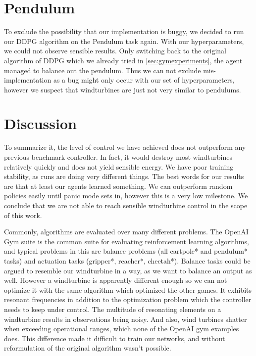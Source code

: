 \documentclass[hyperref,final,beleg]{cgvpub}
\begin{document}
\section{Pendulum}
To exclude the possibility that our implementation is buggy, we decided to run our DDPG algorithm on the Pendulum task again. With our hyperparameters, we could not observe sensible results. Only switching back to the original algorithm of \ac{DDPG} which we already tried in \ref{sec:gymexperiments}, the agent managed to balance out the pendulum. Thus we can not exclude mis-implementation as a bug might only occur with our set of hyperparameters, however we suspect that windturbines are just not very similar to pendulums.


\section{Discussion}

To summarize it, the level of control we have achieved does not outperform any previous benchmark controller. In fact, it would destroy most windturbines relatively quickly and does not yield sensible energy. We have poor training stability, as runs are doing very different things. The best words for our results are that at least our agents learned something. We can outperform random policies easily until panic mode sets in, however this is a very low milestone. We conclude that we are not able to reach sensible windturbine control in the scope of this work.

Commonly, algorithms are evaluated over many different problems. The OpenAI Gym suite is the common suite for evaluating reinforcement learning algorithms, and typical problems in this are balance problems (all cartpole* and pendulum* tasks) and actuation tasks (gripper*, reacher*, cheetah*). Balance tasks could be argued to resemble our windturbine in a way, as we want to balance an output as well. However a windturbine is apparently different enough so we can not optimize it with the same algorithm which optimized the other games. It exhibits resonant frequencies in addition to the optimization problem which the controller needs to keep under control. The multitude of resonating elements on a windturbine results in observations being noisy. And also, wind turbines shatter when exceeding operational ranges, which none of the OpenAI gym examples does. This difference made it difficult to train our networks, and without reformulation of the original algorithm wasn't possible. 
\end{document}
